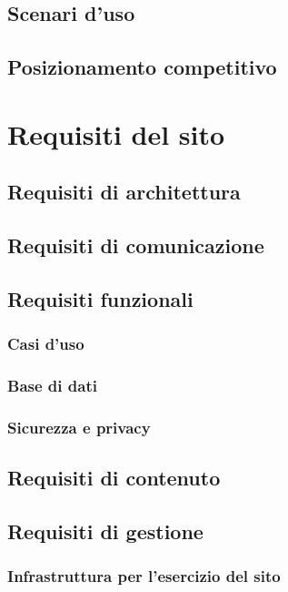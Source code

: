 \documentclass[a4paper,12pt,hidelinks]{report}
\begin{document}
\section{Scenari d'uso}
\section{Posizionamento competitivo}


\chapter{Requisiti del sito}

\section{Requisiti di architettura}

\section{Requisiti di comunicazione}

\section{Requisiti funzionali}
	\subsection{Casi d'uso}
	\subsection{Base di dati}
	\subsection{Sicurezza e privacy}

\section{Requisiti di contenuto}

\section{Requisiti di gestione}
	\subsection{Infrastruttura per l'esercizio del sito}
\end{document}
